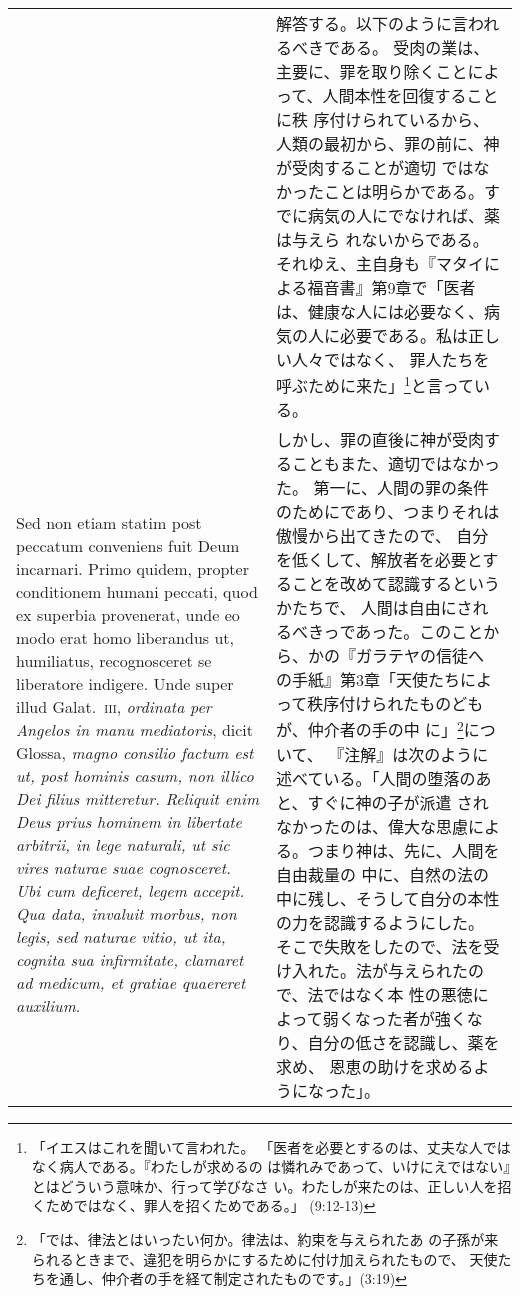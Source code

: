 \documentclass[10pt]{jsarticle} %
\begin{document}
\begin{longtable}{p{21em}p{21em}}
&

解答する。以下のように言われるべきである。
受肉の業は、主要に、罪を取り除くことによって、人間本性を回復することに秩
 序付けられているから、人類の最初から、罪の前に、神が受肉することが適切
 ではなかったことは明らかである。すでに病気の人にでなければ、薬は与えら
 れないからである。それゆえ、主自身も『マタイによる福音書』第9章で「医者
 は、健康な人には必要なく、病気の人に必要である。私は正しい人々ではなく、
 罪人たちを呼ぶために来た」\footnote{「イエスはこれを聞いて言われた。
 「医者を必要とするのは、丈夫な人ではなく病人である。『わたしが求めるの
 は憐れみであって、いけにえではない』とはどういう意味か、行って学びなさ
 い。わたしが来たのは、正しい人を招くためではなく、罪人を招くためである。」
 (9:12-13)}と言っている。

\\

Sed non etiam statim post
peccatum conveniens fuit Deum incarnari. 
Primo quidem, propter
conditionem humani peccati, quod ex superbia provenerat, unde eo modo
erat homo liberandus ut, humiliatus, recognosceret se liberatore
indigere. Unde super illud Galat.~{\scshape iii}, {\itshape ordinata per Angelos in manu
mediatoris}, dicit Glossa, {\itshape magno consilio factum est ut, post hominis
casum, non illico Dei filius mitteretur. Reliquit enim Deus prius
hominem in libertate arbitrii, in lege naturali, ut sic vires naturae
suae cognosceret. Ubi cum deficeret, legem accepit. Qua data, invaluit
morbus, non legis, sed naturae vitio, ut ita, cognita sua infirmitate,
clamaret ad medicum, et gratiae quaereret auxilium}. 


&

しかし、罪の直後に神が受肉することもまた、適切ではなかった。
第一に、人間の罪の条件のためにであり、つまりそれは傲慢から出てきたので、
 自分を低くして、解放者を必要とすることを改めて認識するというかたちで、
 人間は自由にされるべきっであった。このことから、かの『ガラテヤの信徒へ
 の手紙』第3章「天使たちによって秩序付けられたものどもが、仲介者の手の中
 に」\footnote{「では、律法とはいったい何か。律法は、約束を与えられたあ
 の子孫が来られるときまで、違犯を明らかにするために付け加えられたもので、
 天使たちを通し、仲介者の手を経て制定されたものです。」(3:19)}について、
 『注解』は次のように述べている。「人間の堕落のあと、すぐに神の子が派遣
 されなかったのは、偉大な思慮による。つまり神は、先に、人間を自由裁量の
 中に、自然の法の中に残し、そうして自分の本性の力を認識するようにした。
 そこで失敗をしたので、法を受け入れた。法が与えられたので、法ではなく本
 性の悪徳によって弱くなった者が強くなり、自分の低さを認識し、薬を求め、
 恩恵の助けを求めるようになった」。



\end{longtable}
\end{document}
